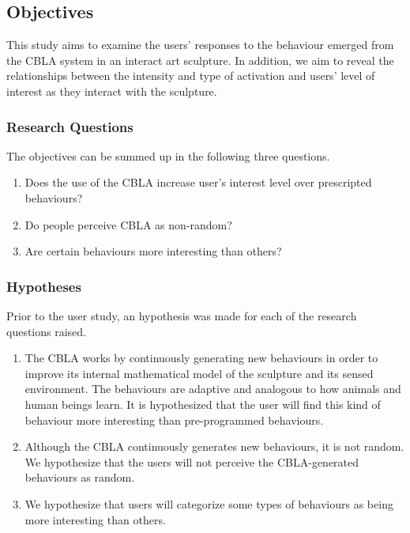 \subsection{Objectives}

This study aims to examine the users' responses to the behaviour emerged from the CBLA system in an interact art sculpture. In addition, we aim to reveal the relationships between the intensity and type of activation and users' level of interest as they interact with the sculpture.

\subsubsection{Research Questions}

The objectives can be summed up in the following three questions.

\begin{enumerate}
	\item Does the use of the CBLA increase user's interest level over prescripted behaviours? 	\label{itm:research-q1}
	\item Do people perceive CBLA as non-random? \label{itm:research-q2}
	\item Are certain behaviours  more interesting than others? \label{itm:research-q3}
\end{enumerate}


\subsubsection{Hypotheses}

Prior to the user study, an hypothesis was made for each of the research questions raised.

\begin{enumerate}
	\item The CBLA works by continuously generating new behaviours in order to improve its internal mathematical model of the sculpture and its sensed environment. The behaviours are adaptive and analogous to how animals and human beings learn. It is hypothesized that the user will find this kind of behaviour more interesting than pre-programmed behaviours.
	\item Although the CBLA continuously generates new behaviours, it is not random. We hypothesize that the users will not perceive the CBLA-generated behaviours as random. 
	\item We hypothesize that users will categorize some types of behaviours as being more interesting than others. 
\end{enumerate}


